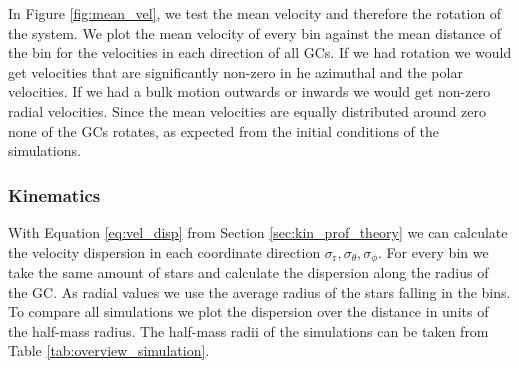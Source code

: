 In Figure \ref{fig:mean_vel}, we test the mean velocity and therefore the rotation of the system. We plot the mean velocity of every bin against the mean distance of the bin for the velocities in each direction of all \acp{GC}. If we had rotation we would get velocities that are significantly non-zero in he azimuthal and the polar velocities. If we had a bulk motion outwards or inwards we would get non-zero radial velocities. Since the mean velocities are equally distributed around zero none of the \acp{GC} rotates, as expected from the initial conditions of the simulations.

\subsubsection{Kinematics}\label{sec:kinematics}
With Equation \eqref{eq:vel_disp} from Section \ref{sec:kin_prof_theory} we can calculate the velocity dispersion in each coordinate direction \(\sigma_\mathrm{r},\sigma_\theta,\sigma_\phi\). For every bin we take the same amount of stars and calculate the dispersion along the radius of the \ac{GC}. As radial values we use the average radius of the stars falling in the bins. To compare all simulations we plot the dispersion over the distance in units of the half-mass radius. The half-mass radii of the simulations can be taken from Table \ref{tab:overview_simulation}. 
